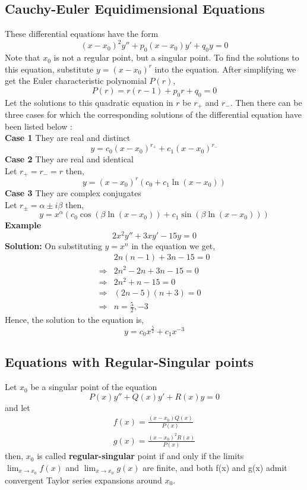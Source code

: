 \documentclass[10pt]{article}
\begin{document}
        \subsection{Cauchy-Euler Equidimensional Equations}
            These differential equations have the form $$(x-x_0)^2y'' + p_0(x-x_0)y' + q_0y = 0$$ Note that $x_0$ is not a regular point, but a singular point. To find the solutions to this equation, substitute $y=(x-x_0)^r$ into the equation. After simplifying we get the Euler characteristic polynomial $P(r)$,
            $$P(r) = r(r-1) + p_0r  + q_0 = 0$$
            Let the solutions to this quadratic equation in $r$ be $r_+$ and $r_-$. Then there can be three cases for which the corresponding solutions of the differential equation have been listed below :\\
            \textbf{Case 1} They are real and distinct\\
            $$y = c_0(x-x_0)^{r_+} + c_1(x-x_0)^{r_-}$$
            \textbf{Case 2} They are real and identical \\
            Let $r_+ = r_- = r$ then,
            $$y = (x-x_0)^{r}(c_0 + c_1 \ln (x-x_0))$$
            \textbf{Case 3} They are complex conjugates \\
            Let $r_\pm = \alpha \pm i \beta$ then,
            $$y = x^\alpha(c_0\cos (\beta\ln(x-x_0)) + c_1\sin (\beta \ln (x-x_0)))$$
            \textbf{Example} \\
            $$2x^2y'' + 3xy' - 15y = 0$$
            \textbf{Solution: } On substituting $y = x^n$ in the equation we get,
            \begin{align*}
                &2n(n-1) + 3n - 15 = 0 \\
                \Rightarrow &2n^2 - 2n + 3n - 15 = 0 \\
                \Rightarrow &2n^2 + n - 15 = 0\\
                \Rightarrow &(2n - 5)(n + 3) = 0 \\
                \Rightarrow & n = \frac{5}{2}, -3
            \end{align*}
            Hence, the solution to the equation is, 
            $$y = c_0x^\frac{5}{2} + c_1x^{-3}$$
        \subsection{Equations with Regular-Singular points}
        Let $x_0$ be a singular point of the equation $$P(x)y'' + Q(x)y' + R(x)y = 0$$ and let
        \begin{align*}
            f(x) = \frac{(x-x_0)Q(x)}{P(x)}\\
            g(x) = \frac{(x-x_0)^2R(x)}{P(x)}
        \end{align*}
        then, $x_0$ is called \textbf{regular-singular} point if and only if the limits $\lim_{x\to x_0} f(x)$ and $\lim_{x\to x_0} g(x)$ are finite, and both f(x) and g(x) admit convergent Taylor series expansions around $x_0$.\\ \\
        
\end{document}
